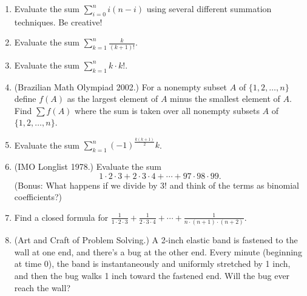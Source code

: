\documentclass[12pt]{article}
\begin{document}
\begin{enumerate}


\item Evaluate the sum $\sum_{i=0}^n i(n-i)$ using several different summation techniques.  Be creative!

\item Evaluate the sum $\sum_{k=1}^n \frac{k}{(k+1)!}$.

\item Evaluate the sum $\sum_{k=1}^n k\cdot k!$.

\item (Brazilian Math Olympiad 2002.)  For a nonempty subset $A$ of $\{1,2,\ldots,n\}$ define $f(A)$ as the largest element of $A$ minus the smallest element of $A$.  Find $\sum f(A)$ where the sum is taken over all nonempty subsets $A$ of $\{1,2,\ldots,n\}$.

\item Evaluate the sum $\sum_{k=1}^n (-1)^{\frac{k(k+1)}{2}} k$.

\item (IMO Longlist 1978.)  Evaluate the sum $$1\cdot 2\cdot 3+2\cdot 3\cdot 4+\cdots+97\cdot 98\cdot 99.$$  (Bonus: What happens if we divide by $3!$ and think of the terms as binomial coefficients?)

\item Find a closed formula for $\frac{1}{1\cdot 2 \cdot 3}+\frac{1}{2\cdot 3 \cdot 4}+\cdots+\frac{1}{n\cdot (n+1) \cdot (n+2)}.$

\item (Art and Craft of Problem Solving.)  A 2-inch elastic band is fastened to the wall at one end, and there's a bug at the other end.  Every minute (beginning at time 0), the band is instantaneously and uniformly stretched by 1 inch, and then the bug walks 1 inch toward the fastened end.  Will the bug ever reach the wall?


\end{enumerate}
\end{document}
